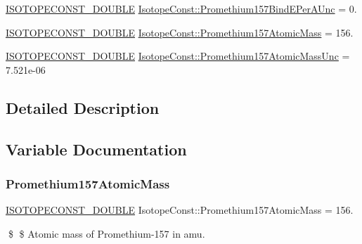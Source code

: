 \begin{DoxyCompactItemize}
\item 
\mbox{\hyperlink{group___isotope_const-_macros_ga8f45a7272ce02c0b4c65c44636ed719a}{I\+S\+O\+T\+O\+P\+E\+C\+O\+N\+S\+T\+\_\+\+D\+O\+U\+B\+LE}} \mbox{\hyperlink{group___isotope_const-_promethium-_pm157_ga12aea026a2cf03440a612e938404fb6b}{Isotope\+Const\+::\+Promethium157\+Bind\+E\+Per\+A\+Unc}} = 0.
\item 
\mbox{\hyperlink{group___isotope_const-_macros_ga8f45a7272ce02c0b4c65c44636ed719a}{I\+S\+O\+T\+O\+P\+E\+C\+O\+N\+S\+T\+\_\+\+D\+O\+U\+B\+LE}} \mbox{\hyperlink{group___isotope_const-_promethium-_pm157_gad03bb507367dca1b99dbd0aa7a1af244}{Isotope\+Const\+::\+Promethium157\+Atomic\+Mass}} = 156.
\item 
\mbox{\hyperlink{group___isotope_const-_macros_ga8f45a7272ce02c0b4c65c44636ed719a}{I\+S\+O\+T\+O\+P\+E\+C\+O\+N\+S\+T\+\_\+\+D\+O\+U\+B\+LE}} \mbox{\hyperlink{group___isotope_const-_promethium-_pm157_gaf2cf2775980624347457d1a0fe887702}{Isotope\+Const\+::\+Promethium157\+Atomic\+Mass\+Unc}} = 7.\+521e-\/06
\end{DoxyCompactItemize}


\subsection{Detailed Description}


\subsection{Variable Documentation}
\mbox{\label{group___isotope_const-_promethium-_pm157_gad03bb507367dca1b99dbd0aa7a1af244}} 
\subsubsection{\texorpdfstring{Promethium157\+Atomic\+Mass}{Promethium157AtomicMass}}
{\footnotesize\ttfamily \mbox{\hyperlink{group___isotope_const-_macros_ga8f45a7272ce02c0b4c65c44636ed719a}{I\+S\+O\+T\+O\+P\+E\+C\+O\+N\+S\+T\+\_\+\+D\+O\+U\+B\+LE}} Isotope\+Const\+::\+Promethium157\+Atomic\+Mass = 156.}

\$ \$ Atomic mass of Promethium-\/157 in amu. \mbox{\label{group___isotope_const-_promethium-_pm157_gaf2cf2775980624347457d1a0fe887702}} 
